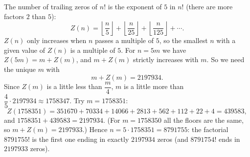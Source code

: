 The number of trailing zeros of $n!$ is the exponent of $5$ in $n!$ (there are more factors $2$ than $5$):
\[Z(n)=\left\lfloor\dfrac n5\right\rfloor+\left\lfloor\dfrac n{25}\right\rfloor+\left\lfloor\dfrac n{125}\right\rfloor+\cdots.\]
$Z(n)$ only increases when $n$ passes a multiple of $5$, so the smallest $n$ with a given value of $Z(n)$ is a multiple of $5$. For $n=5m$ we have $Z(5m)=m+Z(m)$, and $m+Z(m)$ strictly increases with $m$. So we need the unique $m$ with
\[m+Z(m)=2197934.\]
Since $Z(m)$ is a little less than $\dfrac m4$, $m$ is a little more than $\dfrac45\cdot2197934\approx1758347$. Try $m=1758351$:
\[Z(1758351)=351670+70334+14066+2813+562+112+22+4=439583,\]
and $1758351+439583=2197934$. (For $m=1758350$ all the floors are the same, so $m+Z(m)=2197933$.) Hence $n=5\cdot1758351=\boxed{8791755}$: the factorial $8791755!$ is the first one ending in exactly $2197934$ zeros (and $8791754!$ ends in $2197933$ zeros).

